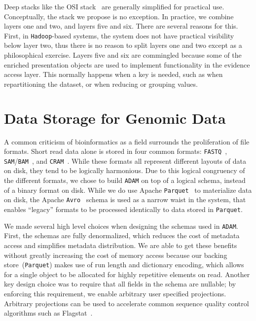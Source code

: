 \documentclass[masters]{ucbthesis}
\begin{document}
Deep stacks like the OSI stack~\cite{zimmermann80} are generally simplified for practical use. Conceptually,
the stack we propose is no exception. In practice, we combine layers one and two, and layers five and six.
There are several reasons for this. First, in \texttt{Hadoop}-based systems, the system does not have practical visibility
below layer two, thus there is no reason to split layers one and two except as a philosophical exercise.
Layers five and six are commingled because some of the enriched presentation objects are used to
implement functionality in the evidence access layer. This normally happens when a key is needed, such as
when repartitioning the dataset, or when reducing or grouping values.

\section{Data Storage for Genomic Data}
\label{sec:schema-design}

A common criticism of bioinformatics as a field surrounds the proliferation of file formats. Short read data alone is
stored in four common formats: \texttt{FASTQ}~\cite{cock10}, \texttt{SAM}/\texttt{BAM}~\cite{li09}, and
\texttt{CRAM}~\cite{fritz11}. While these formats all represent different layouts of data on disk, they tend to be
logically harmonious. Due to this logical congruency of the different formats, we chose to build \texttt{ADAM}
on top of a logical schema, instead of a binary format on disk. While we do use Apache \texttt{Parquet}~\cite{parquet} to
materialize data on disk, the Apache \texttt{Avro}~\cite{avro} schema is used as a narrow waist in the system,
that enables ``legacy'' formats to be processed identically to data stored in \texttt{Parquet}.

We made several high level choices when designing the schemas used in \texttt{ADAM}. First, the schemas are fully
denormalized, which reduces the cost of metadata access and simplifies metadata distribution. We are able to
get these benefits without greatly increasing the cost of memory access because our backing store~(\texttt{Parquet})
makes use of run length and dictionary encoding, which allows for a single object to be allocated for highly repetitive
elements on read. Another key design choice was to require that all fields in the schema are nullable; by enforcing
this requirement, we enable arbitrary user specified projections. Arbitrary projections can be used to accelerate
common sequence quality control algorithms such as Flagstat~\cite{massie13, nothaft15}.
\end{document}
